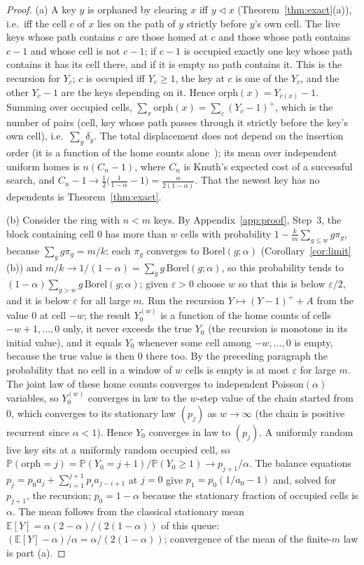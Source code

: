 \documentclass[11pt,a4paper]{article}
\theoremstyle{definition}
\theoremstyle{remark}
\newcommand{\Prob}{\mathbb{P}}
\newcommand{\E}{\mathbb{E}}
\begin{document}
\begin{proof}
(a) A key $y$ is orphaned by clearing $x$ iff $y\lhd x$ (Theorem~\ref{thm:exact}(a)), i.e.\ iff the cell $c$ of $x$ lies on the path of $y$ strictly before $y$'s own cell. The live keys whose path contains $c$ are those homed at $c$ and those whose path contains $c-1$ and whose cell is not $c-1$; if $c-1$ is occupied exactly one key whose path contains it has its cell there, and if it is empty no path contains it. This is the recursion for $Y_c$; $c$ is occupied iff $Y_c\ge1$, the key at $c$ is one of the $Y_c$, and the other $Y_c-1$ are the keys depending on it. Hence $\mathrm{orph}(x)=Y_{c(x)}-1$. Summing over occupied cells, $\sum_x\mathrm{orph}(x)=\sum_c(Y_c-1)^+$, which is the number of pairs (cell, key whose path passes through it strictly before the key's own cell), i.e.\ $\sum_y\delta_y$. The total displacement does not depend on the insertion order (it is a function of the home counts alone~\cite{knuth3}); its mean over independent uniform homes is $n(C_n-1)$, where $C_n$ is Knuth's expected cost of a successful search, and $C_n-1\to\tfrac12\bigl(\tfrac1{1-\alpha}-1\bigr)=\tfrac{\alpha}{2(1-\alpha)}$. That the newest key has no dependents is Theorem~\ref{thm:exact}.

(b) Consider the ring with $n<m$ keys. By Appendix~\ref{app:proof}, Step~3, the block containing cell $0$ has more than $w$ cells with probability $1-\frac km\sum_{g\le w}g\pi_g$, because $\sum_g g\pi_g=m/k$; each $\pi_g$ converges to $\mathrm{Borel}(g;\alpha)$ (Corollary~\ref{cor:limit}(b)) and $m/k\to1/(1-\alpha)=\sum_g g\,\mathrm{Borel}(g;\alpha)$, so this probability tends to $(1-\alpha)\sum_{g>w}g\,\mathrm{Borel}(g;\alpha)$; given $\varepsilon>0$ choose $w$ so that this is below $\varepsilon/2$, and it is below $\varepsilon$ for all large $m$. Run the recursion $Y\mapsto(Y-1)^++A$ from the value $0$ at cell $-w$; the result $Y^{(w)}_0$ is a function of the home counts of cells $-w+1,\dots,0$ only, it never exceeds the true $Y_0$ (the recursion is monotone in its initial value), and it equals $Y_0$ whenever some cell among $-w,\dots,0$ is empty, because the true value is then $0$ there too. By the preceding paragraph the probability that no cell in a window of $w$ cells is empty is at most $\varepsilon$ for large $m$. The joint law of these home counts converges to independent Poisson$(\alpha)$ variables, so $Y_0^{(w)}$ converges in law to the $w$-step value of the chain started from $0$, which converges to its stationary law $(p_j)$ as $w\to\infty$ (the chain is positive recurrent since $\alpha<1$). Hence $Y_0$ converges in law to $(p_j)$. A uniformly random live key sits at a uniformly random occupied cell, so $\Prob(\mathrm{orph}=j)=\Prob(Y_0=j+1)/\Prob(Y_0\ge1)\to p_{j+1}/\alpha$. The balance equations $p_j=p_0a_j+\sum_{i=1}^{j+1}p_ia_{j-i+1}$ at $j=0$ give $p_1=p_0(1/a_0-1)$ and, solved for $p_{j+1}$, the recursion; $p_0=1-\alpha$ because the stationary fraction of occupied cells is $\alpha$. The mean follows from the classical stationary mean $\E[Y]=\alpha(2-\alpha)/(2(1-\alpha))$ of this queue: $(\E[Y]-\alpha)/\alpha=\alpha/(2(1-\alpha))$; convergence of the mean of the finite-$m$ law is part (a).


\end{proof}
\end{document}
